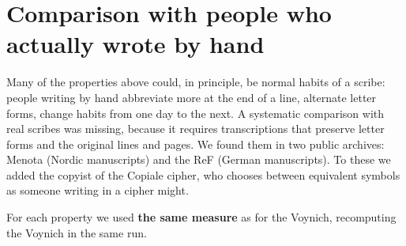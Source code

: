 \section{Comparison with people who actually wrote by hand}
\label{sec:scribes}

Many of the properties above could, in principle, be normal habits of a scribe: people writing by hand abbreviate more
at the end of a line, alternate letter forms, change habits from one day to the next. A systematic comparison with real
scribes was missing, because it requires transcriptions that preserve letter forms and the original lines and pages. We
found them in two public archives: Menota (Nordic manuscripts) and the ReF (German manuscripts). To these we added the
copyist of the Copiale cipher, who chooses between equivalent symbols as someone writing in a cipher might.

For each property we used \textbf{the same measure} as for the Voynich, recomputing the Voynich in the same run.

